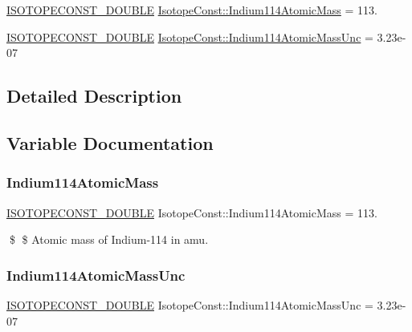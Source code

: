 \begin{DoxyCompactItemize}
\item 
\mbox{\hyperlink{group___isotope_const-_macros_ga8f45a7272ce02c0b4c65c44636ed719a}{I\+S\+O\+T\+O\+P\+E\+C\+O\+N\+S\+T\+\_\+\+D\+O\+U\+B\+LE}} \mbox{\hyperlink{group___isotope_const-_indium-_in114_ga8916696f6bb1209282cfa1e3b77d6814}{Isotope\+Const\+::\+Indium114\+Atomic\+Mass}} = 113.
\item 
\mbox{\hyperlink{group___isotope_const-_macros_ga8f45a7272ce02c0b4c65c44636ed719a}{I\+S\+O\+T\+O\+P\+E\+C\+O\+N\+S\+T\+\_\+\+D\+O\+U\+B\+LE}} \mbox{\hyperlink{group___isotope_const-_indium-_in114_gaa033f42ba7a2b5a71218b9b48a56143d}{Isotope\+Const\+::\+Indium114\+Atomic\+Mass\+Unc}} = 3.\+23e-\/07
\end{DoxyCompactItemize}


\subsection{Detailed Description}


\subsection{Variable Documentation}
\mbox{\label{group___isotope_const-_indium-_in114_ga8916696f6bb1209282cfa1e3b77d6814}} 
\subsubsection{\texorpdfstring{Indium114\+Atomic\+Mass}{Indium114AtomicMass}}
{\footnotesize\ttfamily \mbox{\hyperlink{group___isotope_const-_macros_ga8f45a7272ce02c0b4c65c44636ed719a}{I\+S\+O\+T\+O\+P\+E\+C\+O\+N\+S\+T\+\_\+\+D\+O\+U\+B\+LE}} Isotope\+Const\+::\+Indium114\+Atomic\+Mass = 113.}

\$ \$ Atomic mass of Indium-\/114 in amu. \mbox{\label{group___isotope_const-_indium-_in114_gaa033f42ba7a2b5a71218b9b48a56143d}} 
\subsubsection{\texorpdfstring{Indium114\+Atomic\+Mass\+Unc}{Indium114AtomicMassUnc}}
{\footnotesize\ttfamily \mbox{\hyperlink{group___isotope_const-_macros_ga8f45a7272ce02c0b4c65c44636ed719a}{I\+S\+O\+T\+O\+P\+E\+C\+O\+N\+S\+T\+\_\+\+D\+O\+U\+B\+LE}} Isotope\+Const\+::\+Indium114\+Atomic\+Mass\+Unc = 3.\+23e-\/07}

